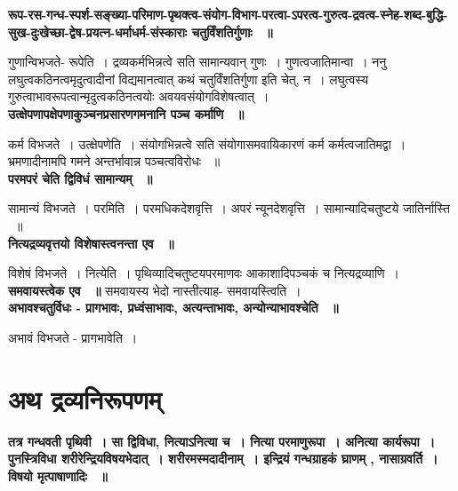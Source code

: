 {\bfseries रूप-रस-गन्ध-स्पर्श-सङ्ख्या-परिमाण-पृथक्‍त्व-संयोग-विभाग-परत्वा-ऽपरत्व-गुरुत्व-द्रवत्व-स्‍नेह-शब्द-बुद्धि-सुख-दुःखेच्छा-द्वेष-प्रयत्‍न-धर्माधर्म-संस्काराः चतुर्विंशतिर्गुणाः ~॥}\par
	गुणान्विभजते- रूपेति~। द्रव्यकर्मभिन्नत्वे सति सामान्यवान् गुणः~। गुणत्वजातिमान्वा~। ननु लघुत्वकठिनत्वमृदुत्वादीनां विद्यमानत्वात् कथं चतुर्विंशतिर्गुणा इति चेत्, न~। लघुत्वस्य गुरुत्वाभावरूपत्वान्मृदुत्वकठिनत्वयोः अवयवसंयोगविशेषत्वात्~।\\[10pt]
{\bfseries उत्क्षेपणापक्षेपणाकुञ्चनप्रसारणगमनानि पञ्च कर्माणि ~॥}\par
	कर्म विभजते~। उत्क्षेपणेति~। संयोगभिन्नत्वे सति संयोगासमवायिकारणं कर्म कर्मत्वजातिमद्वा~। भ्रमणादीनामपि गमने अन्तर्भावान्न पञ्चत्वविरोधः ~॥\\[10pt]
{\bfseries परमपरं चेति द्विविधं सामान्यम् ~॥}\par
	सामान्यं विभजते~। परमिति~। परमधिकदेशवृत्ति~। अपरं न्यूनदेशवृत्ति~। सामान्यादिचतुष्टये जातिर्नास्ति ~॥\\[10pt]
{\bfseries नित्यद्रव्यवृत्तयो विशेषास्त्वनन्ता एव ~॥}\par
	विशेषं विभजते~। नित्येति~। पृथिव्यादिचतुष्टयपरमाणवः आकाशादिपञ्चकं च नित्यद्रव्याणि~।\\[10pt]
{\bfseries समवायस्त्वेक एव ~॥}
	समवायस्य भेदो नास्तीत्याह- समवायस्त्विति~।\\[10pt]
{\bfseries अभावश्चतुर्विधः - प्रागभावः, प्रध्वंसाभावः, अत्यन्ताभावः, अन्योन्याभावश्चेति ~॥}\par
	अभावं विभजते - प्रागभावेति~। \section*{अथ द्रव्यनिरूपणम्}
{\bfseries तत्र गन्धवती पृथिवी~। सा द्विविधा, नित्याऽनित्या च~। नित्या परमाणुरूपा~। अनित्या कार्यरूपा~। पुनस्त्रिविधा शरीरेन्द्रियविषयभेदात्~। शरीरमस्मदादीनाम्~। इन्द्रियं गन्धग्राहकं घ्राणम् , नासाग्रवर्ति~। विषयो मृत्पाषाणादिः ~॥}\par

